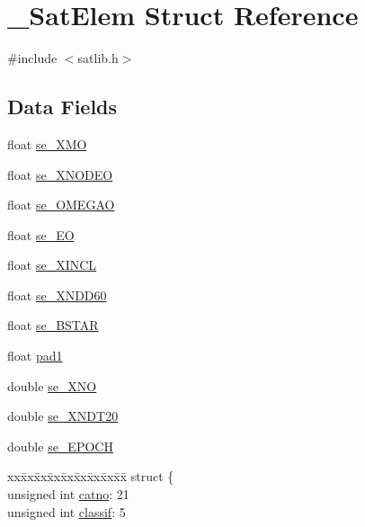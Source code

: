 \hypertarget{struct___sat_elem}{\section{\-\_\-\-Sat\-Elem Struct Reference}
\label{struct___sat_elem}
}


{\ttfamily \#include $<$satlib.\-h$>$}

\subsection*{Data Fields}
\begin{DoxyCompactItemize}
\item 
float \hyperlink{struct___sat_elem_aa146285d54323061c76de2405e64c6bf}{se\-\_\-\-X\-M\-O}
\item 
float \hyperlink{struct___sat_elem_a74d35f2c9772d5951cb24aa631e3e4df}{se\-\_\-\-X\-N\-O\-D\-E\-O}
\item 
float \hyperlink{struct___sat_elem_af530e5942e833b59ba385cacbed189e0}{se\-\_\-\-O\-M\-E\-G\-A\-O}
\item 
float \hyperlink{struct___sat_elem_a11986bb255a52da8614cfacc1155bf89}{se\-\_\-\-E\-O}
\item 
float \hyperlink{struct___sat_elem_a5a9a336e24ea5df7051e5ce3b126a87e}{se\-\_\-\-X\-I\-N\-C\-L}
\item 
float \hyperlink{struct___sat_elem_aae09d71117e666583cbcf89186b10865}{se\-\_\-\-X\-N\-D\-D60}
\item 
float \hyperlink{struct___sat_elem_a282db948ea254d1ca2de2dfc9ee698c0}{se\-\_\-\-B\-S\-T\-A\-R}
\item 
float \hyperlink{struct___sat_elem_afdbc8e77fc81473ca1baa8f1f9b68f25}{pad1}
\item 
double \hyperlink{struct___sat_elem_aafa866947f4ac775274333db067aac77}{se\-\_\-\-X\-N\-O}
\item 
double \hyperlink{struct___sat_elem_a7dbd7b9b28a50bfbe0313592200f02b3}{se\-\_\-\-X\-N\-D\-T20}
\item 
double \hyperlink{struct___sat_elem_a31e22c4bf1c6745eaa88c19e1fb78cab}{se\-\_\-\-E\-P\-O\-C\-H}
\item 
\begin{tabbing}
xx\=xx\=xx\=xx\=xx\=xx\=xx\=xx\=xx\=\kill
struct \{\\
\>unsigned int \hyperlink{struct___sat_elem_a1bf11c0e76b4a6e2e34485990276cca6}{catno}: 21\\
\>unsigned int \hyperlink{struct___sat_elem_a99c4f0b298134a76356c70ae6cf13a26}{classif}: 5\\

\end{tabbing}
\end{DoxyCompactItemize}
